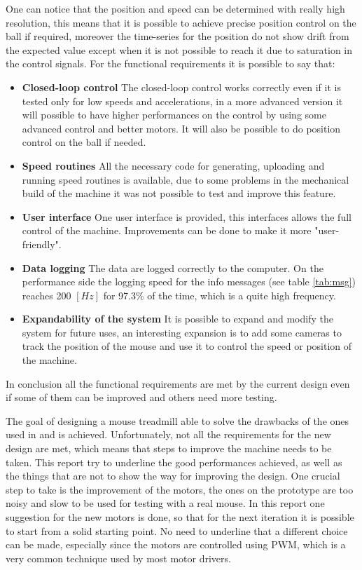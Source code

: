\documentclass[12pt,a4paper, twoside]{article}
\begin{document}
\noindent
One can notice that the position and speed can be determined with really high resolution, this means that it is possible to achieve precise position control on the ball if required, moreover the time-series for the position do not show drift from the expected value except when it is not possible to reach it due to saturation in the control signals.
For the functional requirements it is possible to say that:
\begin{itemize}
	\item \textbf{Closed-loop control} The closed-loop control works correctly even if it is tested only for low speeds and accelerations, in a more advanced version it will possible to have higher performances on the control by using some advanced control and better motors. It will also be possible to do position control on the ball if needed.
	
	\item \textbf{Speed routines} All the necessary code for generating, uploading and running speed routines is available, due to some problems in the mechanical build of the machine it was not possible to test and improve this feature.
	
	\item \textbf{User interface} One user interface is provided, this interfaces allows the full control of the machine. Improvements can be done to make it more "user-friendly".
	
	\item \textbf{Data logging} The data are logged correctly to the computer. On the performance side the logging speed for the info messages (see table \ref{tab:msg}) reaches 200 $[Hz]$ for 97.3\% of the time, which is a quite high frequency.
	
	\item \textbf{Expandability of the system} It is possible to expand and modify the system for future uses, an interesting expansion is to add some cameras to track the position of the mouse and use it to control the speed or position of the machine.
\end{itemize}
In conclusion all the functional requirements are met by the current design even if some of them can be improved and others need more testing.
\newline

The goal of designing a mouse treadmill able to solve the drawbacks of the ones used in \cite{Ole} and \cite{Neuron} is achieved. Unfortunately, not all the requirements for the new design are met, which means that steps to improve the machine needs to be taken. This report try to underline the good performances achieved, as well as the things that are not to show the way for improving the design.
One crucial step to take is the improvement of the motors, the ones on the prototype are too noisy and slow to be used for testing with a real mouse. In this report one suggestion for the new motors is done, so that for the next iteration it is possible to start from a solid starting point. No need to underline that a different choice can be made, especially since the motors are controlled using PWM, which is a very common technique used by most motor drivers.\\
\end{document}
